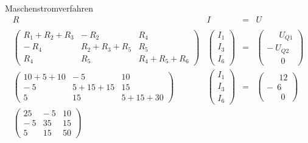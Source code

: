 \begin{example}{Maschenstromverfahren}
    \[
        \begin{array}{cccc}
            R & I & = & U        \\\\
            \begin{pmatrix}
                R_1 + R_2 + R_3 & - \ R_2         & R_4             \\
                - \ R_4         & R_2 + R_3 + R_5 & R_5             \\
                R_4             & R_5             & R_4 + R_5 + R_6
            \end{pmatrix}
              &
            \begin{pmatrix}
                I_1 \\
                I_3 \\
                I_6
            \end{pmatrix}
              & = &
            \begin{pmatrix}
                \phantom{-} \ U_{Q1} \\
                - \ U_{Q2}           \\
                \phantom{-} \ \ 0
            \end{pmatrix} \\
            \begin{pmatrix}
                10 + 5 + 10 & - \ 5       & 10          \\
                - \ 5       & 5 + 15 + 15 & 15          \\
                5           & 15          & 5 + 15 + 30
            \end{pmatrix}
              &
            \begin{pmatrix}
                I_1 \\
                I_3 \\
                I_6
            \end{pmatrix}
              & = &
            \begin{pmatrix}
                \phantom{-} \ 12 \\
                - \ \ 6          \\
                \phantom{-} \ \ 0
            \end{pmatrix}     \\
            \begin{pmatrix}
                25    & - \ 5 & 10 \\
                - \ 5 & 35    & 15 \\
                5     & 15    & 50

\end{pmatrix}
\end{array}\]
\end{example}
